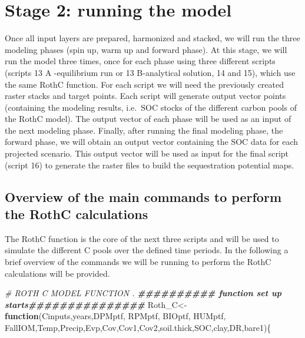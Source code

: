 \documentclass[
  10pt,
  b5paper,
]{book}
\newenvironment{Shaded}{\begin{snugshade}}{\end{snugshade}}
\newcommand{\CommentTok}[1]{\textcolor[rgb]{0.56,0.35,0.01}{\textit{#1}}}
\newcommand{\ControlFlowTok}[1]{\textcolor[rgb]{0.13,0.29,0.53}{\textbf{#1}}}
\newcommand{\DocumentationTok}[1]{\textcolor[rgb]{0.56,0.35,0.01}{\textbf{\textit{#1}}}}
\newcommand{\NormalTok}[1]{#1}
\newcommand{\OtherTok}[1]{\textcolor[rgb]{0.56,0.35,0.01}{#1}}
\begin{document}
\hypertarget{stage-2-running-the-model-1}{%
\chapter{\textbar{} Stage 2: running the model}\label{stage-2-running-the-model-1}}

Once all input layers are prepared, harmonized and stacked, we will run the three modeling phases (spin up, warm up and forward phase). At this stage, we will run the model three times, once for each phase using three different scripts (scripts 13 A -equilibrium run or 13 B-analytical solution, 14 and 15), which use the same RothC function. For each script we will need the previously created raster stacks and target points. Each script will generate output vector points (containing the modeling results, i.e.~SOC stocks of the different carbon pools of the RothC model). The output vector of each phase will be used as an input of the next modeling phase. Finally, after running the final modeling phase, the forward phase, we will obtain an output vector containing the SOC data for each projected scenario. This output vector will be used as input for the final script (script 16) to generate the raster files to build the sequestration potential maps.

\hypertarget{overview-of-the-main-commands-to-perform-the-rothc-calculations}{%
\section{Overview of the main commands to perform the RothC calculations}\label{overview-of-the-main-commands-to-perform-the-rothc-calculations}}

The RothC function is the core of the next three scripts and will be used to simulate the different C pools over the defined time periods. In the following a brief overview of the commands we will be running to perform the RothC calculations will be provided.

\begin{Shaded}
\begin{Highlighting}[]
\CommentTok{\# ROTH C MODEL FUNCTION .}
\DocumentationTok{\#\#\#\#\#\#\#\#\#\# function set up starts\#\#\#\#\#\#\#\#\#\#\#\#\#\#\# }
\NormalTok{Roth\_C}\OtherTok{\textless{}{-}}\ControlFlowTok{function}\NormalTok{(Cinputs,years,DPMptf, RPMptf, BIOptf, HUMptf, FallIOM,Temp,Precip,Evp,Cov,Cov1,Cov2,soil.thick,SOC,clay,DR,bare1)\{}
\end{Highlighting}
\end{Shaded}
\end{document}
